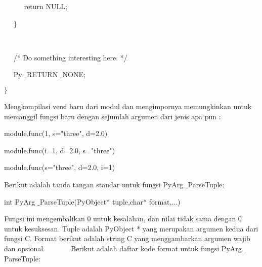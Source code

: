 \documentclass{wileySix}
\begin{document}
\begin{myEnumerate}
{\begin{myEnumerate}
\noindent 
~~~~~ return NULL; \par
\noindent 
~~  $  \}  $ \par
\noindent 
~~  \par
\noindent 
~~ /* Do something interesting here. */ \par
\noindent 
~~ Py $  \_  $RETURN $  \_  $NONE; \par
\noindent 
$  \}  $ \par
\vspace{12pt}
Mengkompilasi versi baru dari modul dan mengimpornya memungkinkan untuk memanggil fungsi baru dengan sejumlah argumen dari jenis apa pun : \par
\noindent 
module.func(1, s="three", d=2.0) \par
\noindent 
module.func(i=1, d=2.0, s="three") \par
\noindent 
module.func(s="three", d=2.0, i=1) \par
\vspace{12pt}
\vspace{12pt}
\vspace{12pt}
\vspace{12pt}
\noindent 
\hspace*{0.5in} Berikut adalah tanda tangan standar untuk fungsi PyArg $  \_  $ParseTuple: \par
\noindent 
int PyArg $  \_  $ParseTuple(PyObject* tuple,char* format,...) \par
\vspace{12pt}
\noindent 
\hspace*{0.5in} Fungsi ini mengembalikan 0 untuk kesalahan, dan nilai tidak sama dengan 0 untuk kesuksesan. Tuple adalah PyObject * yang merupakan argumen kedua dari fungsi C. Format berikut adalah string C yang menggambarkan argumen wajib dan opsional.\vspace{\baselineskip}
~~~~~~ Berikut adalah daftar kode format untuk fungsi PyArg $  \_  $ParseTuple: \par





\end{myEnumerate}}
\end{myEnumerate}
\end{document}
